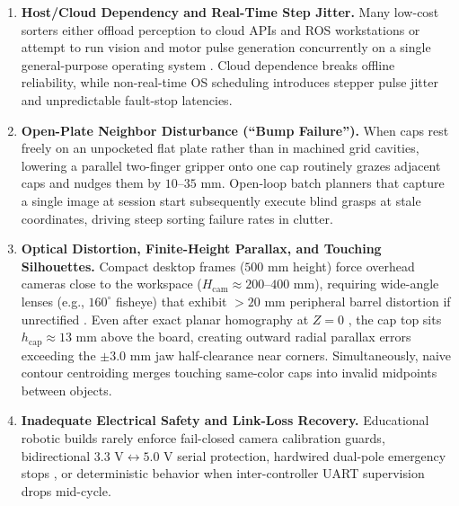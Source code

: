 \documentclass[10pt,twocolumn,letterpaper]{article}
\begin{document}
\begin{enumerate}
  \item \textbf{Host/Cloud Dependency and Real-Time Step Jitter.} Many low-cost sorters either offload perception to cloud APIs and ROS workstations \cite{hossen2025wastesortbot} or attempt to run vision and motor pulse generation concurrently on a single general-purpose operating system \cite{pereira2014lowcost}. Cloud dependence breaks offline reliability, while non-real-time OS scheduling introduces stepper pulse jitter and unpredictable fault-stop latencies.
  \item \textbf{Open-Plate Neighbor Disturbance (``Bump Failure'').} When caps rest freely on an unpocketed flat plate rather than in machined grid cavities, lowering a parallel two-finger gripper onto one cap routinely grazes adjacent caps and nudges them by $10\text{--}35\text{ mm}$. Open-loop batch planners that capture a single image at session start subsequently execute blind grasps at stale coordinates, driving steep sorting failure rates in clutter.
  \item \textbf{Optical Distortion, Finite-Height Parallax, and Touching Silhouettes.} Compact desktop frames ($500\text{ mm}$ height) force overhead cameras close to the workspace ($H_{\mathrm{cam}}\approx 200\text{--}400\text{ mm}$), requiring wide-angle lenses (e.g., $160^\circ$ fisheye) that exhibit $>20\text{ mm}$ peripheral barrel distortion if unrectified \cite{kannala2006generic}. Even after exact planar homography at $Z=0$ \cite{hartley2004multiple}, the cap top sits $h_{\mathrm{cap}}\approx 13\text{ mm}$ above the board, creating outward radial parallax errors exceeding the $\pm 3.0\text{ mm}$ jaw half-clearance near corners. Simultaneously, naive contour centroiding merges touching same-color caps into invalid midpoints between objects.
  \item \textbf{Inadequate Electrical Safety and Link-Loss Recovery.} Educational robotic builds rarely enforce fail-closed camera calibration guards, bidirectional $3.3\text{ V}\leftrightarrow 5.0\text{ V}$ serial protection, hardwired dual-pole emergency stops \cite{iso13850}, or deterministic behavior when inter-controller UART supervision drops mid-cycle.
\end{enumerate}
\end{document}
